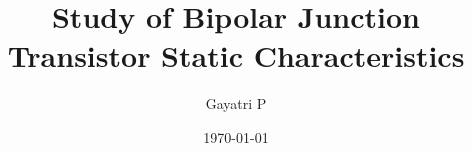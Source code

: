 \documentclass[reprint,amsmath,amssymb,aps]{revtex4-2}
\begin{document}
    \title{Study of Bipolar Junction Transistor Static Characteristics}

    \author{Gayatri P}
    \date{\today}

    
    \maketitle

    
    
    

    
    
    \nocite{*}
\end{document}
